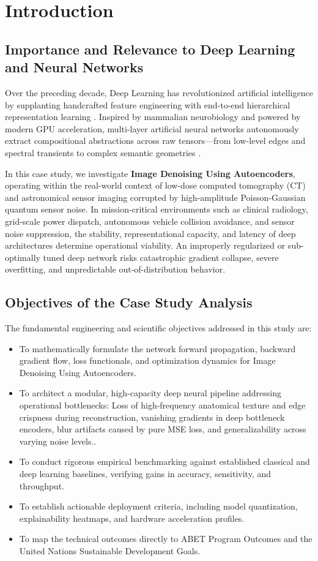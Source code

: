 \section{Introduction}

\subsection{Importance and Relevance to Deep Learning and Neural Networks}
Over the preceding decade, Deep Learning has revolutionized artificial intelligence by supplanting handcrafted feature engineering with end-to-end hierarchical representation learning \cite{lecun2015deep}. Inspired by mammalian neurobiology and powered by modern GPU acceleration, multi-layer artificial neural networks autonomously extract compositional abstractions across raw tensors---from low-level edges and spectral transients to complex semantic geometries \cite{goodfellow2016deep}.

In this case study, we investigate \textbf{Image Denoising Using Autoencoders}, operating within the real-world context of low-dose computed tomography (CT) and astronomical sensor imaging corrupted by high-amplitude Poisson-Gaussian quantum sensor noise. In mission-critical environments such as clinical radiology, grid-scale power dispatch, autonomous vehicle collision avoidance, and sensor noise suppression, the stability, representational capacity, and latency of deep architectures determine operational viability. An improperly regularized or sub-optimally tuned deep network risks catastrophic gradient collapse, severe overfitting, and unpredictable out-of-distribution behavior.

\subsection{Objectives of the Case Study Analysis}
The fundamental engineering and scientific objectives addressed in this study are:
\begin{itemize}
  \item To mathematically formulate the network forward propagation, backward gradient flow, loss functionals, and optimization dynamics for Image Denoising Using Autoencoders.
  \item To architect a modular, high-capacity deep neural pipeline addressing operational bottlenecks: Loss of high-frequency anatomical texture and edge crispness during reconstruction, vanishing gradients in deep bottleneck encoders, blur artifacts caused by pure MSE loss, and generalizability across varying noise levels..
  \item To conduct rigorous empirical benchmarking against established classical and deep learning baselines, verifying gains in accuracy, sensitivity, and throughput.
  \item To establish actionable deployment criteria, including model quantization, explainability heatmaps, and hardware acceleration profiles.
  \item To map the technical outcomes directly to ABET Program Outcomes and the United Nations Sustainable Development Goals.
\end{itemize}
